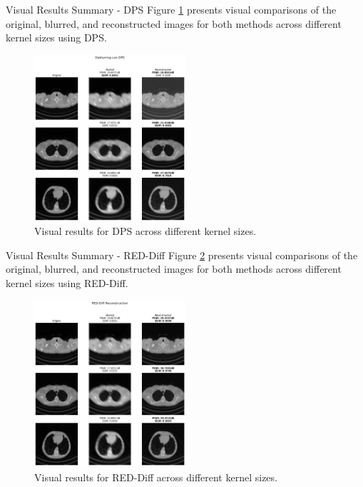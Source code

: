 \begin{frame}{Visual Results Summary - DPS}
    Figure \ref{fig:visual_results_dps} presents visual comparisons of the original, blurred, and reconstructed images for both methods across different kernel sizes using DPS.
    \begin{figure}
        \centering
        \includegraphics[width=0.5\textwidth]{media/deblurring_dps.png}
        \caption{Visual results for DPS across different kernel sizes.}
        \label{fig:visual_results_dps}
    \end{figure}

\end{frame}
\begin{frame}{Visual Results Summary - RED-Diff}
    Figure \ref{fig:visual_results_red_diff} presents visual comparisons of the original, blurred, and reconstructed images for both methods across different kernel sizes using RED-Diff.
    \begin{figure}
        \centering
        \includegraphics[width=0.5\textwidth]{media/deblurring_reddiff.png}
        \caption{Visual results for RED-Diff across different kernel sizes.}
        \label{fig:visual_results_red_diff}
    \end{figure}
\end{frame}

